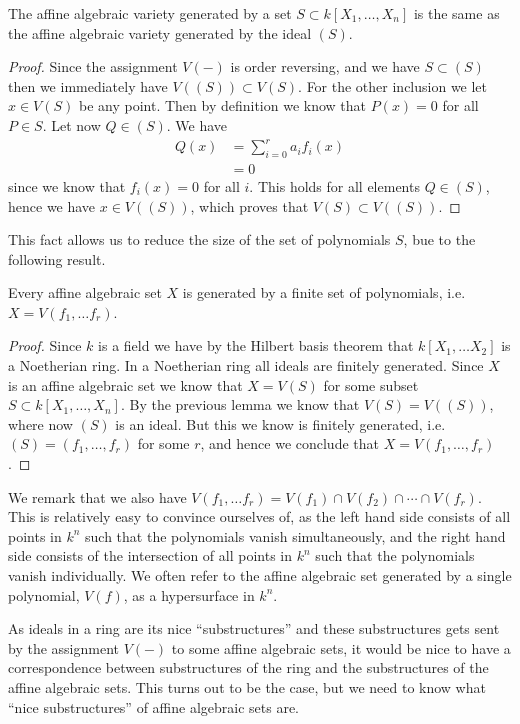 \begin{lemma}
The affine algebraic variety generated by a set $S\subset k[X_1, \ldots, X_n]$ is the same as the affine algebraic variety generated by the ideal $(S)$.
\end{lemma}
\begin{proof}
Since the assignment $V(-)$ is order reversing, and we have $S\subset (S)$ then we immediately have $V((S))\subset V(S)$. For the other inclusion we let $x\in V(S)$ be any point. Then by definition we know that $P(x)=0$ for all $P\in S$. Let now $Q\in (S)$. We have 
\begin{align*}
    Q(x) 
    &= \sum_{i=0}^r a_i f_i(x) \\
    &= 0
\end{align*}
since we know that $f_i(x) = 0$ for all $i$. This holds for all elements $Q\in (S)$, hence we have $x\in V((S))$, which proves that $V(S)\subset V((S))$. 
\end{proof}

This fact allows us to reduce the size of the set of polynomials $S$, bue to the following result. 

\begin{proposition}
Every affine algebraic set $X$ is generated by a finite set of polynomials, i.e. $X=V(f_1, \ldots f_r)$.
\end{proposition}
\begin{proof}
Since $k$ is a field we have by the Hilbert basis theorem that $k[X_1, \ldots X_2]$ is a Noetherian ring. In a Noetherian ring all ideals are finitely generated. Since $X$ is an affine algebraic set we know that $X=V(S)$ for some subset $S\subset k[X_1, \ldots, X_n]$. By the previous lemma we know that $V(S)=V((S))$, where now $(S)$ is an ideal. But this we know is finitely generated, i.e. $(S) = (f_1, \ldots, f_r)$ for some $r$, and hence we conclude that $X=V(f_1, \ldots, f_r)$. 
\end{proof}

We remark that we also have $V(f_1, \ldots f_r) = V(f_1)\cap V(f_2)\cap \cdots \cap V(f_r)$. This is relatively easy to convince ourselves of, as the left hand side consists of all points in $k^n$ such that the polynomials vanish simultaneously, and the right hand side consists of the intersection of all points in $k^n$ such that the polynomials vanish individually. We often refer to the affine algebraic set generated by a single polynomial, $V(f)$, as a hypersurface in $k^n$. 

As ideals in a ring are its nice ``substructures'' and these substructures gets sent by the assignment $V(-)$ to some affine algebraic sets, it would be nice to have a correspondence between substructures of the ring and the substructures of the affine algebraic sets. This turns out to be the case, but we need to know what ``nice substructures'' of affine algebraic sets are. 

